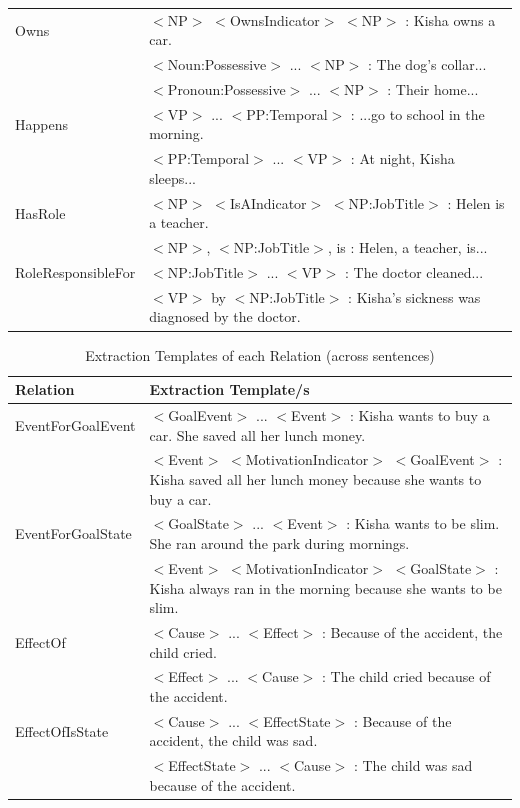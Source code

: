 \begin{table}[H]
\begin{tabular}{|p{3.5cm}|p{10cm}|}
Owns				& $<$NP$>$ $<$OwnsIndicator$>$ $<$NP$>$ : Kisha owns a car. \\
					& $<$Noun:Possessive$>$ ... $<$NP$>$ : The dog's collar... \\
					& $<$Pronoun:Possessive$>$ ... $<$NP$>$ : Their home... \\ \hline
Happens				& $<$VP$>$ ... $<$PP:Temporal$>$ : ...go to school in the morning. \\
					& $<$PP:Temporal$>$ ... $<$VP$>$ : At night, Kisha sleeps... \\ \hline
HasRole				& $<$NP$>$ $<$IsAIndicator$>$ $<$NP:JobTitle$>$ : Helen is a teacher. \\
					& $<$NP$>$, $<$NP:JobTitle$>$, is : Helen, a teacher, is... \\ \hline
RoleResponsibleFor	& $<$NP:JobTitle$>$ ... $<$VP$>$ : The doctor cleaned... \\
					& $<$VP$>$ by $<$NP:JobTitle$>$ : Kisha's sickness was diagnosed by the doctor. \\ \hline
\end{tabular}
\label{tab:templates1}
\end{table}

\begin{table}[H]   %
\centering
\caption{Extraction Templates of each Relation (across sentences)} \vspace{0.25em}
\begin{tabular}{|p{3.5cm}|p{10cm}|} \hline
\textbf{Relation} & \textbf{Extraction Template/s} \\ \hline
EventForGoalEvent	& $<$GoalEvent$>$ ... $<$Event$>$ : Kisha wants to buy a car. She saved all her lunch money. \\
					& $<$Event$>$ $<$MotivationIndicator$>$ $<$GoalEvent$>$ : Kisha saved all her lunch money because she wants to buy a car. \\ \hline
EventForGoalState	& $<$GoalState$>$ ... $<$Event$>$ :  Kisha wants to be slim. She ran around the park during mornings. \\
					& $<$Event$>$ $<$MotivationIndicator$>$ $<$GoalState$>$ : Kisha always ran in the morning because she wants to be slim. \\ \hline
EffectOf			& $<$Cause$>$ ... $<$Effect$>$ : Because of the accident, the child cried. \\
					& $<$Effect$>$ ... $<$Cause$>$ : The child cried because of the accident. \\ \hline			
EffectOfIsState		& $<$Cause$>$ ... $<$EffectState$>$ : Because of the accident, the child was sad. \\
					& $<$EffectState$>$ ... $<$Cause$>$ : The child was sad because of the accident. \\ \hline		
\end{tabular}
\label{tab:templates2}
\end{table}

